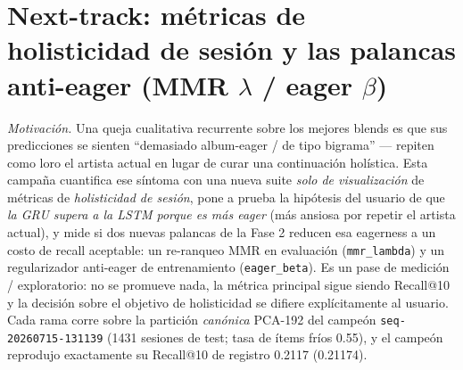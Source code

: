 \documentclass[11pt]{article}
\newcommand{\dsid}[1]{\texttt{\small #1}}
\begin{document}
\section{Next-track: métricas de holisticidad de sesión y las palancas anti-eager (MMR $\lambda$ / eager $\beta$)}
\label{sec:nexttrack-holisticness}
\emph{Motivación.} Una queja cualitativa recurrente sobre los mejores blends es que
sus predicciones se sienten ``demasiado album-eager / de tipo bigrama'' --- repiten
como loro el artista actual en lugar de curar una continuación holística. Esta
campaña cuantifica ese síntoma con una nueva suite \emph{solo de visualización} de
métricas de \emph{holisticidad de sesión}, pone a prueba la hipótesis del usuario de
que \emph{la GRU supera a la LSTM porque es más eager} (más ansiosa por repetir el
artista actual), y mide si dos nuevas palancas de la Fase 2 reducen esa eagerness a
un costo de recall aceptable: un re-ranqueo MMR en evaluación (\texttt{mmr\_lambda}) y
un regularizador anti-eager de entrenamiento (\texttt{eager\_beta}). Es un pase de
medición / exploratorio: no se promueve nada, la métrica principal sigue siendo
Recall@10 y la decisión sobre el objetivo de holisticidad se difiere explícitamente al
usuario. Cada rama corre sobre la partición \emph{canónica} PCA-192 del campeón
\dsid{seq-20260715-131139} (\num{1431} sesiones de test; tasa de ítems fríos
\num{0.55}), y el campeón reprodujo exactamente su Recall@10 de registro \num{0.2117}
(\num{0.21174}).
\end{document}
